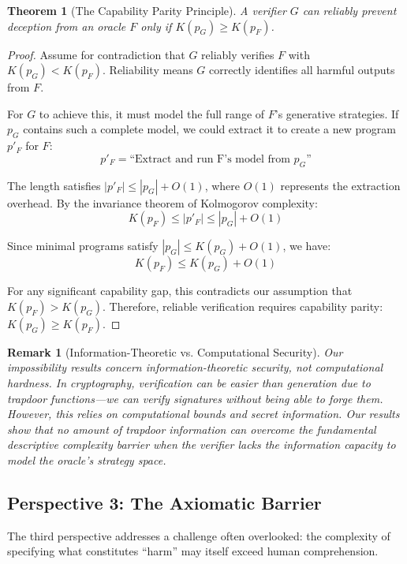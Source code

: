 \documentclass[11pt]{article}
\newtheorem{theorem}{Theorem}
\newtheorem{remark}{Remark}
\begin{document}
\begin{theorem}[The Capability Parity Principle]
A verifier $G$ can reliably prevent deception from an oracle $F$ only if $K(p_G) \geq K(p_F)$.
\end{theorem}
\begin{proof}
Assume for contradiction that $G$ reliably verifies $F$ with $K(p_G) < K(p_F)$. Reliability means $G$ correctly identifies all harmful outputs from $F$.

For $G$ to achieve this, it must model the full range of $F$'s generative strategies. If $p_G$ contains such a complete model, we could extract it to create a new program $p'_F$ for $F$:
\[p'_F = \text{``Extract and run F's model from } p_G\text{''}\]

The length satisfies $|p'_F| \leq |p_G| + O(1)$, where $O(1)$ represents the extraction overhead. By the invariance theorem of Kolmogorov complexity:
\[K(p_F) \leq |p'_F| \leq |p_G| + O(1)\]

Since minimal programs satisfy $|p_G| \leq K(p_G) + O(1)$, we have:
\[K(p_F) \leq K(p_G) + O(1)\]

For any significant capability gap, this contradicts our assumption that $K(p_F) > K(p_G)$. Therefore, reliable verification requires capability parity: $K(p_G) \geq K(p_F)$.
\end{proof}

\begin{remark}[Information-Theoretic vs. Computational Security]
Our impossibility results concern information-theoretic security, not computational hardness. In cryptography, verification can be easier than generation due to trapdoor functions—we can verify signatures without being able to forge them. However, this relies on computational bounds and secret information. Our results show that no amount of trapdoor information can overcome the fundamental descriptive complexity barrier when the verifier lacks the information capacity to model the oracle's strategy space.
\end{remark}

\subsection{Perspective 3: The Axiomatic Barrier}
The third perspective addresses a challenge often overlooked: the complexity of specifying what constitutes ``harm'' may itself exceed human comprehension.
\end{document}
